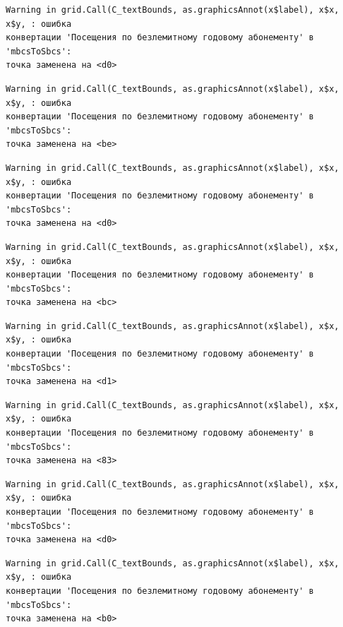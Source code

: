 \documentclass[
  letterpaper,
  DIV=11,
  numbers=noendperiod]{scrreprt}
\begin{document}
\begin{verbatim}
Warning in grid.Call(C_textBounds, as.graphicsAnnot(x$label), x$x, x$y, : ошибка
конвертации 'Посещения по безлемитному годовому абонементу' в 'mbcsToSbcs':
точка заменена на <d0>
\end{verbatim}

\begin{verbatim}
Warning in grid.Call(C_textBounds, as.graphicsAnnot(x$label), x$x, x$y, : ошибка
конвертации 'Посещения по безлемитному годовому абонементу' в 'mbcsToSbcs':
точка заменена на <be>
\end{verbatim}

\begin{verbatim}
Warning in grid.Call(C_textBounds, as.graphicsAnnot(x$label), x$x, x$y, : ошибка
конвертации 'Посещения по безлемитному годовому абонементу' в 'mbcsToSbcs':
точка заменена на <d0>
\end{verbatim}

\begin{verbatim}
Warning in grid.Call(C_textBounds, as.graphicsAnnot(x$label), x$x, x$y, : ошибка
конвертации 'Посещения по безлемитному годовому абонементу' в 'mbcsToSbcs':
точка заменена на <bc>
\end{verbatim}

\begin{verbatim}
Warning in grid.Call(C_textBounds, as.graphicsAnnot(x$label), x$x, x$y, : ошибка
конвертации 'Посещения по безлемитному годовому абонементу' в 'mbcsToSbcs':
точка заменена на <d1>
\end{verbatim}

\begin{verbatim}
Warning in grid.Call(C_textBounds, as.graphicsAnnot(x$label), x$x, x$y, : ошибка
конвертации 'Посещения по безлемитному годовому абонементу' в 'mbcsToSbcs':
точка заменена на <83>
\end{verbatim}

\begin{verbatim}
Warning in grid.Call(C_textBounds, as.graphicsAnnot(x$label), x$x, x$y, : ошибка
конвертации 'Посещения по безлемитному годовому абонементу' в 'mbcsToSbcs':
точка заменена на <d0>
\end{verbatim}

\begin{verbatim}
Warning in grid.Call(C_textBounds, as.graphicsAnnot(x$label), x$x, x$y, : ошибка
конвертации 'Посещения по безлемитному годовому абонементу' в 'mbcsToSbcs':
точка заменена на <b0>
\end{verbatim}
\end{document}
